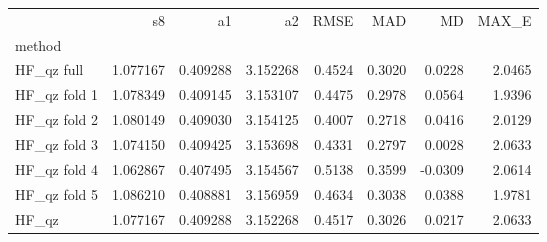 \begin{tabular}{lrrrrrrr}
 & s8 & a1 & a2 & RMSE & MAD & MD & MAX_E \\
method &  &  &  &  &  &  &  \\
HF_qz full & 1.077167 & 0.409288 & 3.152268 & 0.4524 & 0.3020 & 0.0228 & 2.0465 \\
HF_qz fold 1 & 1.078349 & 0.409145 & 3.153107 & 0.4475 & 0.2978 & 0.0564 & 1.9396 \\
HF_qz fold 2 & 1.080149 & 0.409030 & 3.154125 & 0.4007 & 0.2718 & 0.0416 & 2.0129 \\
HF_qz fold 3 & 1.074150 & 0.409425 & 3.153698 & 0.4331 & 0.2797 & 0.0028 & 2.0633 \\
HF_qz fold 4 & 1.062867 & 0.407495 & 3.154567 & 0.5138 & 0.3599 & -0.0309 & 2.0614 \\
HF_qz fold 5 & 1.086210 & 0.408881 & 3.156959 & 0.4634 & 0.3038 & 0.0388 & 1.9781 \\
HF_qz & 1.077167 & 0.409288 & 3.152268 & 0.4517 & 0.3026 & 0.0217 & 2.0633 \\
\end{tabular}
